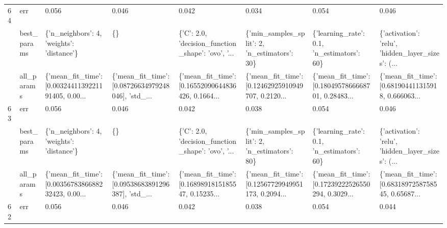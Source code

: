 \begin{tabular}{llllllll}
64 & err &                                              0.056 &                                              0.046 &                                              0.042 &                                              0.034 &                                              0.054 &                                              0.046 \\
   & best\_params &          \{'n\_neighbors': 4, 'weights': 'distance'\} &                                                 \{\} &  \{'C': 2.0, 'decision\_function\_shape': 'ovo', '... &       \{'min\_samples\_split': 2, 'n\_estimators': 30\} &         \{'learning\_rate': 0.1, 'n\_estimators': 60\} &  \{'activation': 'relu', 'hidden\_layer\_sizes': (... \\
   & all\_params &  \{'mean\_fit\_time': [0.0032441139221191405, 0.00... &  \{'mean\_fit\_time': [0.08726634979248046], 'std\_... &  \{'mean\_fit\_time': [0.16552090644836426, 0.1664... &  \{'mean\_fit\_time': [0.12462925910949707, 0.2120... &  \{'mean\_fit\_time': [0.1804957866668701, 0.28483... &  \{'mean\_fit\_time': [0.681904411315918, 0.666063... \\
63 & err &                                              0.056 &                                              0.046 &                                              0.042 &                                              0.038 &                                              0.054 &                                              0.046 \\
   & best\_params &          \{'n\_neighbors': 4, 'weights': 'distance'\} &                                                 \{\} &  \{'C': 2.0, 'decision\_function\_shape': 'ovo', '... &       \{'min\_samples\_split': 2, 'n\_estimators': 80\} &         \{'learning\_rate': 0.1, 'n\_estimators': 60\} &  \{'activation': 'relu', 'hidden\_layer\_sizes': (... \\
   & all\_params &  \{'mean\_fit\_time': [0.0035678386688232423, 0.00... &  \{'mean\_fit\_time': [0.09538683891296387], 'std\_... &  \{'mean\_fit\_time': [0.1689891815185547, 0.15235... &  \{'mean\_fit\_time': [0.12567729949951173, 0.2094... &  \{'mean\_fit\_time': [0.17239222526550294, 0.3029... &  \{'mean\_fit\_time': [0.6831897258758545, 0.65687... \\
62 & err &                                              0.056 &                                              0.046 &                                              0.042 &                                              0.038 &                                              0.054 &                                              0.044 \\

\end{tabular}
